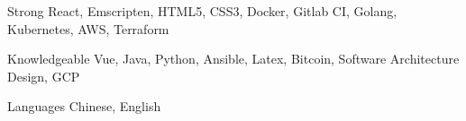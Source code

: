 

\begin{cvskills}

  \cvskill
    {Strong} %
    {React, Emscripten, HTML5, CSS3, Docker, Gitlab CI, Golang, Kubernetes, AWS, Terraform} %

  \cvskill
    {Knowledgeable} %
    {Vue, Java, Python, Ansible, Latex, Bitcoin, Software Architecture Design, GCP} %

  \cvskill
    {Languages} %
    {Chinese, English} %

\end{cvskills}
